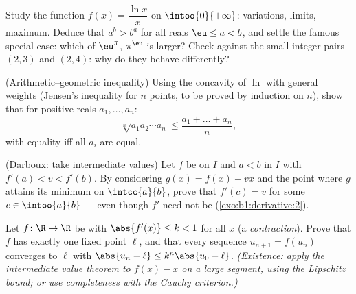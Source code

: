 \begin{exercise}[$\star\star$]\label{exo:b1:derivative:8}
Study the function $f(x) = \dfrac{\ln x}{x}$ on
$\intoo{0}{+\infty}$: variations, limits, maximum. Deduce that $a^b
> b^a$ for all reals $\eu \leq a < b$, and settle the famous special
case: which of $\eu^\pi$, $\pi^\eu$ is larger? Check against the
small integer pairs $(2,3)$ and $(2,4)$: why do they behave
differently?
\end{exercise}

\begin{exercise}[$\star\star$]\label{exo:b1:derivative:9}
(Arithmetic--geometric inequality) Using the concavity of $\ln$ with
general weights (Jensen's inequality for $n$ points, to be proved by
induction on $n$), show that for positive reals $a_1, \dots, a_n$:
\[
\sqrt[n]{a_1 a_2 \cdots a_n} \leq \frac{a_1 + \dots + a_n}{n},
\]
with equality iff all $a_i$ are equal.
\end{exercise}

\begin{exercise}[$\star\star\star$]\label{exo:b1:derivative:10}
(Darboux:  take intermediate values) Let $f$ be
 on $I$ and $a < b$ in $I$ with $f'(a) < v < f'(b)$.
By considering $g(x) = f(x) - vx$ and the point where $g$ attains
its minimum on $\intcc{a}{b}$, prove that $f'(c) = v$ for some $c
\in \intoo{a}{b}$ --- even though $f'$ need not be 
(\cref{exo:b1:derivative:2}).
\end{exercise}

\begin{exercise}[$\star\star\star$]\label{exo:b1:derivative:11}
Let $f \colon \R \to \R$ be  with $\abs{f'(x)} \leq k
< 1$ for all $x$ (a \emph{contraction}). Prove that $f$ has exactly
one fixed point $\ell$, and that every sequence $u_{n+1} = f(u_n)$
converges to $\ell$ with $\abs{u_n - \ell} \leq k^n\abs{u_0 -
\ell}$. \emph{(Existence: apply the intermediate value theorem to
$f(x) - x$ on a large segment, using the Lipschitz bound; or use
completeness with the Cauchy criterion.)}
\end{exercise}

